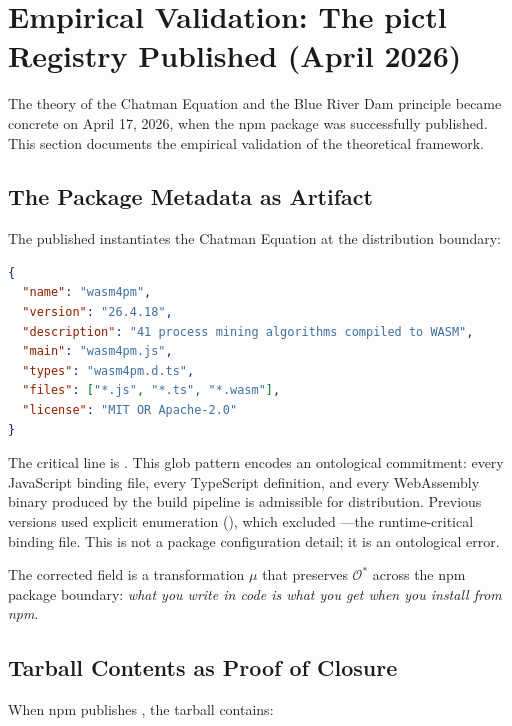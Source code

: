 \documentclass[11pt,a4paper]{article}
\theoremstyle{definition}
\begin{document}
\section{Empirical Validation: The pictl Registry Published (April 2026)}

The theory of the Chatman Equation and the Blue River Dam principle became concrete on April 17, 2026, when the  npm package was successfully published. This section documents the empirical validation of the theoretical framework.

\subsection{The Package Metadata as Artifact}

The published  instantiates the Chatman Equation at the distribution boundary:

\begin{lstlisting}[language=json,caption={wasm4pm/pkg/package.json: the ontology made installable}]
{
  "name": "wasm4pm",
  "version": "26.4.18",
  "description": "41 process mining algorithms compiled to WASM",
  "main": "wasm4pm.js",
  "types": "wasm4pm.d.ts",
  "files": ["*.js", "*.ts", "*.wasm"],
  "license": "MIT OR Apache-2.0"
}
\end{lstlisting}

The critical line is . This glob pattern encodes an ontological commitment: every JavaScript binding file, every TypeScript definition, and every WebAssembly binary produced by the build pipeline is admissible for distribution. Previous versions used explicit enumeration (), which excluded ---the runtime-critical binding file. This is not a package configuration detail; it is an ontological error.

The corrected  field is a transformation $\mu$ that preserves $\mathcal{O}^*$ across the npm package boundary: \textit{what you write in code is what you get when you install from npm}.

\subsection{Tarball Contents as Proof of Closure}

When npm publishes , the tarball contains:
\end{document}
